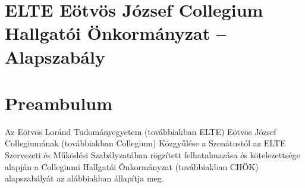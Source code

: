 \documentclass{../styles/rulebook}
\begin{document}
\section*{ELTE Eötvös József Collegium \\ \vspace{0.5em} Hallgatói Önkormányzat -- Alapszabály}

\vspace{2em}


\section*{\normalfont Preambulum} 

Az Eötvös Loránd Tudományegyetem (továbbiakban ELTE) Eötvös József Collegiumának (továbbiakban Collegium) Közgyűlése a Szenátustól az ELTE Szervezeti és Működési Szabályzatában rögzített felhatalmazása és kötelezettsége alapján a Collegiumi Hallgatói Önkormányzat (továbbiakban CHÖK) alapszabályát az alábbiakban állapítja meg.
\end{document}
